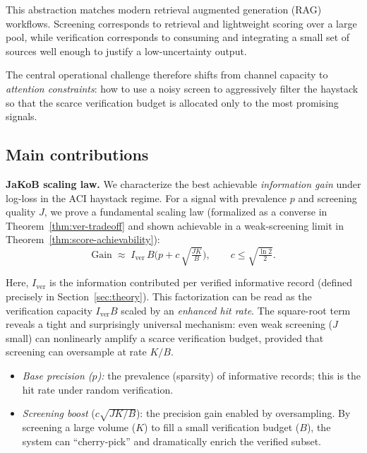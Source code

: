 \documentclass[twocolumn]{scholar7}
\begin{document}
This abstraction matches modern retrieval augmented generation (RAG) workflows.
Screening corresponds to retrieval and lightweight scoring over a large pool, while verification corresponds to consuming and integrating a small set of sources well enough to justify a low-uncertainty output.

The central operational challenge therefore shifts from channel capacity to \emph{attention constraints}: how to use a noisy screen to aggressively filter the haystack so that the scarce verification budget is allocated only to the most promising signals.

\subsection{Main contributions}

\textbf{JaKoB scaling law.}
We characterize the best achievable \emph{information gain} under log-loss in the ACI haystack regime.
For a signal with prevalence $p$ and screening quality $J$, we prove a fundamental scaling law (formalized as a converse in Theorem~\ref{thm:ver-tradeoff} and shown achievable in a weak-screening limit in Theorem~\ref{thm:score-achievability}):
\begin{equation}
\label{eq:intro-jakob}
\mathrm{Gain}
\;\approx\;
I_{\mathrm{ver}}\,B\Bigg(
p
+
c\,\sqrt{\tfrac{J K}{B}}
\Bigg),
\qquad
c\leq \sqrt{\tfrac{\ln 2}{2}}.
\end{equation}

Here, $I_{\mathrm{ver}}$ is the information contributed per verified informative record (defined precisely in Section~\ref{sec:theory}).
This factorization can be read as the verification capacity $I_{\mathrm{ver}}B$ scaled by an \emph{enhanced hit rate}.
The square-root term reveals a tight and surprisingly universal mechanism:
even weak screening ($J$ small) can nonlinearly amplify a scarce verification budget, provided that screening can oversample at rate $K/B$.

\begin{itemize}
  \item \emph{Base precision ($p$):} the prevalence (sparsity) of informative records; this is the hit rate under random verification.
  \item \emph{Screening boost} ($c\sqrt{JK/B}$): the precision gain enabled by oversampling.
  By screening a large volume ($K$) to fill a small verification budget ($B$), the system can ``cherry-pick'' and dramatically enrich the verified subset.
\end{itemize}
\end{document}
